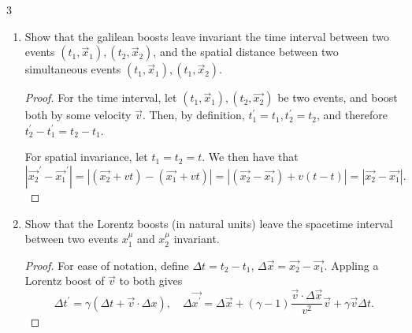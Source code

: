 \documentclass[11pt]{article}
\begin{document}
\begin{problem}{3}\hfill
	\begin{enumerate}[label=(\alph*)]
		\item Show that the galilean boosts leave invariant the time interval between two events \( (t_1, \vec{x}_1), (t_2, \vec{x}_{2}) \), and the spatial distance between two simultaneous events \( (t_1, \vec{x}_1), (t_1, \vec{x}_2) \).
          \begin{proof}
            For the time interval, let \( (t_1, \vec{x}_1), (t_2, \vec{x_2}) \) be two events, and boost both by some velocity \( \vec{v} \).
            Then, by definition, \( t_1^{\prime} = t_1, t_2^{\prime} = t_2 \), and therefore \( t_2^{\prime} - t_1^{\prime} = t_2 - t_1 \).

            For spatial invariance, let \( t_1 = t_2 = t \).
            We then have that
            \begin{equation}
            \label{eq:53}
            |\vec{x_2}^{\prime} - \vec{x_1}^{\prime}| = |(\vec{x_2} + vt) - (\vec{x_1} + vt)| = |(\vec{x_2} - \vec{x_1}) + v(t-t)| = |\vec{x_2} - \vec{x_1}|.
            \end{equation}
          \end{proof}
		\item Show that the Lorentz boosts (in natural units) leave the spacetime interval between two events \( x_1^{\mu} \) and \( x_2^{\mu} \) invariant.
          \begin{proof}
            For ease of notation, define \(\Delta t = t_2 - t_1\), \(\Delta \vec{x} = \vec{x_2} - \vec{x_1} \).
            Appling a Lorentz boost of \( \vec{v} \) to both gives
            \begin{equation}
            \label{eq:54}
            \Delta t^{\prime} = \gamma(\Delta t + \vec{v} \cdot \Delta x), \quad \Delta \vec{x^{\prime}} = \Delta \vec{x} + (\gamma - 1) \frac{\vec{v} \cdot \Delta \vec{x}}{v^2} \vec{v} + \gamma \vec{v} \Delta t.
            \end{equation}


\end{proof}
\end{enumerate}
\end{problem}
\end{document}
